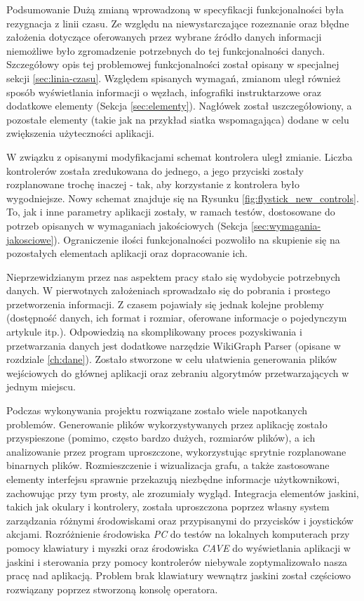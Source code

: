 \begin{chapter}{Podsumowanie}
	Dużą zmianą wprowadzoną w specyfikacji funkcjonalności była rezygnacja z linii czasu. Ze względu na niewystarczające rozeznanie oraz błędne założenia dotyczące oferowanych przez wybrane źródło danych informacji niemożliwe było zgromadzenie potrzebnych do tej funkcjonalności danych. Szczegółowy opis tej problemowej funkcjonalności został opisany w specjalnej sekcji \ref{sec:linia-czasu}. Względem spisanych wymagań, zmianom uległ również sposób wyświetlania informacji o węzłach, infografiki instruktarzowe oraz dodatkowe elementy (Sekcja \ref{sec:elementy}). Nagłówek został uszczegółowiony, a pozostałe elementy (takie jak na przykład siatka wspomagająca) dodane w celu zwiększenia użyteczności aplikacji.

	W związku z opisanymi modyfikacjami schemat kontrolera uległ zmianie. Liczba kontrolerów została zredukowana do jednego, a jego przyciski zostały rozplanowane trochę inaczej - tak, aby korzystanie z kontrolera było wygodniejsze. Nowy schemat znajduje się na Rysunku \ref{fig:flystick_new_controls}. To, jak i inne parametry aplikacji zostały, w ramach testów, dostosowane do potrzeb opisanych w wymaganiach jakościowych (Sekcja \ref{sec:wymagania-jakosciowe}). Ograniczenie ilości funkcjonalności pozwoliło na skupienie się na pozostałych elementach aplikacji oraz dopracowanie ich.

	Nieprzewidzianym przez nas aspektem pracy stało się wydobycie potrzebnych danych. W pierwotnych założeniach sprowadzało się do pobrania i prostego przetworzenia informacji. Z czasem pojawiały się jednak kolejne problemy (dostępność danych, ich format i rozmiar, oferowane informacje o pojedynczym artykule itp.). Odpowiedzią na skomplikowany proces pozyskiwania i przetwarzania danych jest dodatkowe narzędzie WikiGraph Parser (opisane w rozdziale \ref{ch:dane}). Zostało stworzone w celu ułatwienia generowania plików wejściowych do głównej aplikacji oraz zebraniu algorytmów przetwarzających w jednym miejscu.

	Podczas wykonywania projektu rozwiązane zostało wiele napotkanych problemów. Generowanie plików wykorzystywanych przez aplikację zostało przyspieszone (pomimo, często bardzo dużych, rozmiarów plików), a ich analizowanie przez program uproszczone, wykorzystując sprytnie rozplanowane binarnych plików. Rozmieszczenie i wizualizacja grafu, a także zastosowane elementy interfejsu sprawnie przekazują niezbędne informacje użytkownikowi, zachowując przy tym prosty, ale zrozumiały wygląd. Integracja elementów jaskini, takich jak okulary i kontrolery, została uproszczona poprzez własny system zarządzania różnymi środowiskami oraz przypisanymi do przycisków i joysticków akcjami. Rozróżnienie środowiska \textit{PC} do testów na lokalnych komputerach przy pomocy klawiatury i myszki oraz środowiska \textit{CAVE} do wyświetlania aplikacji w jaskini i sterowania przy pomocy kontrolerów niebywale zoptymalizowało nasza pracę nad aplikacją. Problem brak klawiatury wewnątrz jaskini został częściowo rozwiązany poprzez stworzoną konsolę operatora.


\end{chapter}
